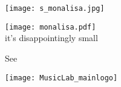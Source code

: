     \begin{center}
      \texttt{[image: s\_monalisa.jpg]}
    \end{center}
    
    \begin{center}
      \bigskip
      \texttt{[image: monalisa.pdf]}\\%
      {\tiny it's disappointingly small}
    \end{center}
    

    \bigskip

    {
      See 
    }
  
  




      
    
    \texttt{[image: MusicLab\_mainlogo]}%
    
